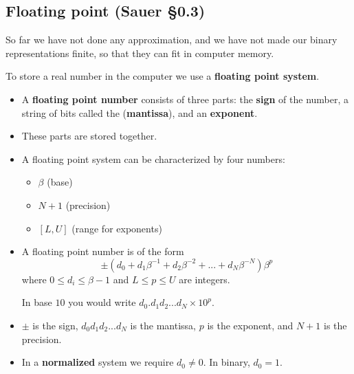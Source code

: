 \documentclass[12pt,letterpaper,noanswers]{exam}
\begin{document}




\subsection{Floating point (Sauer \S 0.3)}

So far we have not done any approximation, and we have not made our binary representations finite, so that they can fit in computer memory.

To store a real number in the computer we use a \textbf{floating point system}.

\begin{tcolorbox}
\begin{itemize}
\itemsep0pt
    \item A \textbf{floating point number} consists of three parts: the \textbf{sign} of the number, a string of bits called the (\textbf{mantissa}), and an \textbf{exponent}.  \cite{sauer2018numerical}
    \item These parts are stored together.
    \item A floating point system can be characterized by four numbers:
\begin{itemize}
\itemsep0pt
    \item $\beta$ (base)
    \item $N+1$ (precision)
    \item $[L,U]$ (range for exponents)
\end{itemize}

\item A floating point number is of the form \[ \pm \left(d_0 + d_1\beta^{-1} + d_2 \beta^{-2} + ... + d_{N}\beta^{-N}\right) \beta^p\] where $0\leq d_i\leq \beta-1$ and $L\leq p \leq U$ are integers.

In base $10$ you would write $d_0.d_1d_2...d_{N} \times 10^p$.
\item $\pm$ is the sign, $d_0d_1d_2...d_{N}$ is the mantissa, $p$ is the exponent, and $N+1$ is the precision.
\item In a \textbf{normalized} system we require $d_0\neq 0$.  In binary, $d_0 = 1$.
\end{itemize}
\end{tcolorbox}
\end{document}
